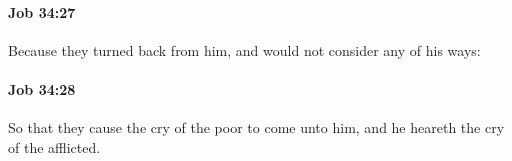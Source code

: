 		\paragraph{Job 34:27} %
			\label{JOB-34-27}

			Because they turned back from him, and would not consider any of his ways:


		\paragraph{Job 34:28} %
			\label{JOB-34-28}

			So that they cause the cry of the poor to come unto him, and he heareth the cry of the afflicted.



